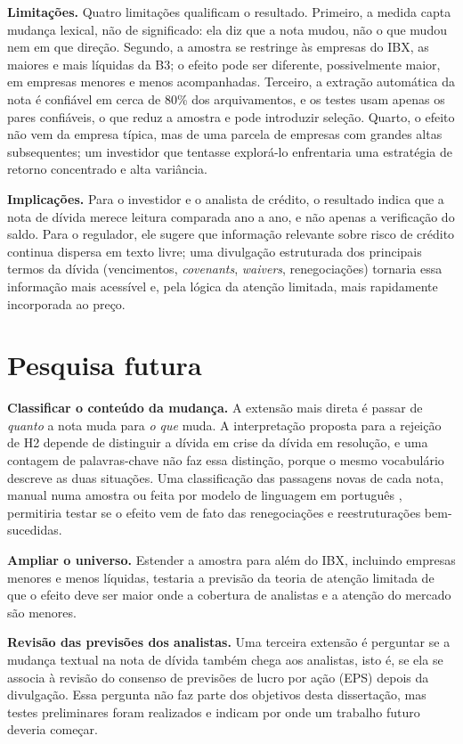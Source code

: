 \documentclass[a4paper,12pt]{report}
\begin{document}
\textbf{Limitações.} Quatro limitações qualificam o resultado. Primeiro, a medida capta mudança lexical, não de significado: ela diz que a nota mudou, não o que mudou nem em que direção. Segundo, a amostra se restringe às empresas do IBX, as maiores e mais líquidas da B3; o efeito pode ser diferente, possivelmente maior, em empresas menores e menos acompanhadas. Terceiro, a extração automática da nota é confiável em cerca de 80\% dos arquivamentos, e os testes usam apenas os pares confiáveis, o que reduz a amostra e pode introduzir seleção. Quarto, o efeito não vem da empresa típica, mas de uma parcela de empresas com grandes altas subsequentes; um investidor que tentasse explorá-lo enfrentaria uma estratégia de retorno concentrado e alta variância.

\textbf{Implicações.} Para o investidor e o analista de crédito, o resultado indica que a nota de dívida merece leitura comparada ano a ano, e não apenas a verificação do saldo. Para o regulador, ele sugere que informação relevante sobre risco de crédito continua dispersa em texto livre; uma divulgação estruturada dos principais termos da dívida (vencimentos, \textit{covenants}, \textit{waivers}, renegociações) tornaria essa informação mais acessível e, pela lógica da atenção limitada, mais rapidamente incorporada ao preço.

\section{Pesquisa futura}
\label{sec:pesquisa_futura}

\textbf{Classificar o conteúdo da mudança.} A extensão mais direta é passar de \emph{quanto} a nota muda para \emph{o que} muda. A interpretação proposta para a rejeição de H2 depende de distinguir a dívida em crise da dívida em resolução, e uma contagem de palavras-chave não faz essa distinção, porque o mesmo vocabulário descreve as duas situações. Uma classificação das passagens novas de cada nota, manual numa amostra ou feita por modelo de linguagem em português \cite{costaneto2025}, permitiria testar se o efeito vem de fato das renegociações e reestruturações bem-sucedidas.

\textbf{Ampliar o universo.} Estender a amostra para além do IBX, incluindo empresas menores e menos líquidas, testaria a previsão da teoria de atenção limitada de que o efeito deve ser maior onde a cobertura de analistas e a atenção do mercado são menores.

\textbf{Revisão das previsões dos analistas.}\label{sec:pesquisa_futura_analistas} Uma terceira extensão é perguntar se a mudança textual na nota de dívida também chega aos analistas, isto é, se ela se associa à revisão do consenso de previsões de lucro por ação (EPS) depois da divulgação. Essa pergunta não faz parte dos objetivos desta dissertação, mas testes preliminares foram realizados e indicam por onde um trabalho futuro deveria começar.
\end{document}
